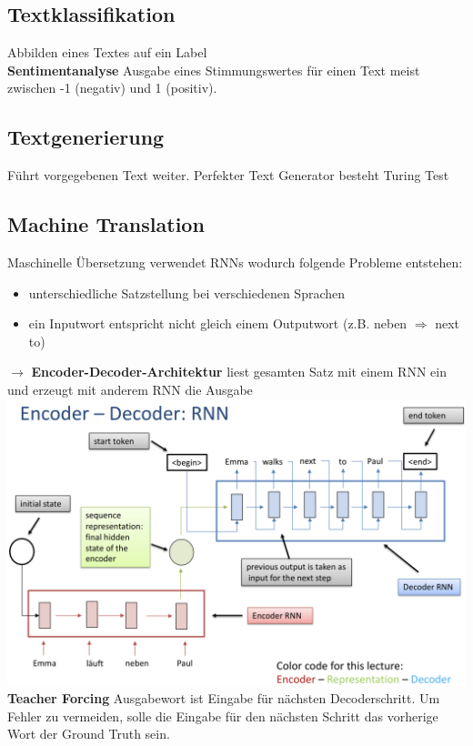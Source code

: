 \documentclass[12pt]{article}
\begin{document}
	\subsection{Textklassifikation}
	Abbilden eines Textes auf ein Label\\
	\textbf{Sentimentanalyse} Ausgabe eines Stimmungswertes für einen Text meist zwischen -1 (negativ) und 1 (positiv).

	\subsection{Textgenerierung}
	Führt vorgegebenen Text weiter. Perfekter Text Generator besteht Turing Test
	
	\subsection{Machine Translation}
	Maschinelle Übersetzung verwendet RNNs wodurch folgende Probleme entstehen:
	\begin{itemize}
		\item unterschiedliche Satzstellung bei verschiedenen Sprachen
		\item ein Inputwort entspricht nicht gleich einem Outputwort (z.B. neben $\Rightarrow$ next to)
	\end{itemize}
	$\rightarrow$ \textbf{Encoder-Decoder-Architektur} liest gesamten Satz mit einem RNN ein und erzeugt mit anderem RNN die Ausgabe\\
	\includegraphics[width=\linewidth]{figures/encoder-decoder-rnn.png}\\
	\textbf{Teacher Forcing} Ausgabewort ist Eingabe für nächsten Decoderschritt. Um Fehler zu vermeiden, solle die Eingabe für den nächsten Schritt das vorherige Wort der Ground Truth sein.\\
\end{document}

